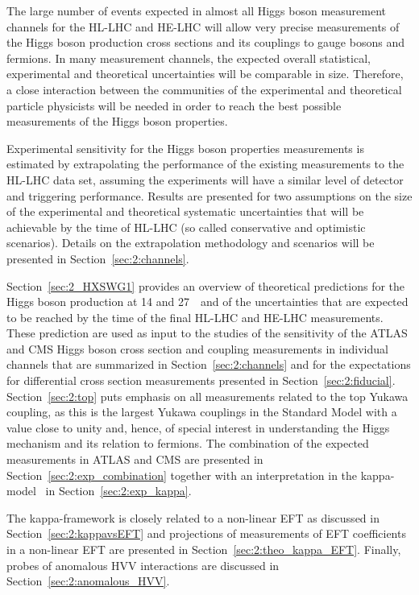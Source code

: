 

The large number of events expected in almost all Higgs boson measurement channels for the HL-LHC and HE-LHC will allow very precise measurements of the Higgs boson production cross sections and its couplings to gauge bosons and fermions. In many measurement channels, the expected overall statistical, experimental and theoretical uncertainties will be comparable in size. Therefore, a close interaction between the communities of the experimental and theoretical particle physicists will be needed in order to reach the best possible measurements of the Higgs boson properties.

Experimental sensitivity for the Higgs boson properties measurements is estimated by extrapolating the performance of the existing measurements to the HL-LHC data set, assuming the experiments will have a similar level of detector and triggering performance. Results are presented for two assumptions on the size of the experimental and theoretical systematic uncertainties that will be achievable by the time of HL-LHC (so called conservative and optimistic scenarios). Details on the extrapolation methodology and scenarios will be presented in Section~\ref{sec:2:channels}.

Section~\ref{sec:2_HXSWG1} provides an overview of theoretical predictions for the Higgs boson production at 14 and 27~\UTeV\ and of the uncertainties that are expected to be reached by the time of the final HL-LHC and HE-LHC measurements. 
These prediction are used as input to the studies of the sensitivity of the ATLAS and CMS Higgs boson cross section and coupling measurements in individual channels that are summarized in Section~\ref{sec:2:channels} and for the expectations for differential cross section measurements presented in Section~\ref{sec:2:fiducial}.
Section~\ref{sec:2:top} puts emphasis on all measurements related to the top Yukawa coupling, as this is the largest Yukawa couplings in the Standard Model with a value close to unity and, hence, of special interest in understanding the Higgs mechanism and its relation to fermions.
The combination of the expected measurements in ATLAS and CMS are presented in Section~\ref{sec:2:exp_combination} together with an interpretation in the kappa-model~\cite{LHCHiggsCrossSectionWorkingGroup:2012nn,Heinemeyer:2013tqa} in Section~\ref{sec:2:exp_kappa}.

The kappa-framework is closely related to a non-linear EFT as discussed in Section~\ref{sec:2:kappavsEFT} and projections of measurements of EFT coefficients in a non-linear EFT are presented in Section~\ref{sec:2:theo_kappa_EFT}. 
Finally, probes of anomalous HVV interactions are discussed in Section~\ref{sec:2:anomalous_HVV}.
